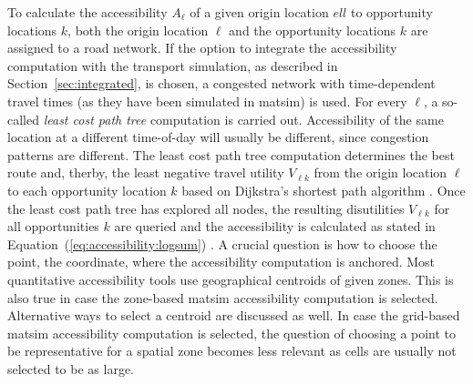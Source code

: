 To calculate the accessibility $A_\ell$ of a given origin location $ell$ to opportunity locations $k$, both
the origin location $\ell$ and the opportunity locations $k$ are assigned to a road network. If the option to
integrate the accessibility computation with the transport simulation, as described in Section~\ref{sec:integrated},
is chosen, a congested network with time-dependent travel times (as they have been simulated in \gls{matsim})
is used. For every $\ell$, a so-called \emph{least cost path tree} computation
\citep{LefebvreBalmer2007Fastshortestpath} is carried out. Accessibility of the same location at a different
time-of-day will usually be different, since congestion patterns are different.
The least cost path tree computation determines the best route and, therby, the least negative travel
utility $V_{\ell k}$ from the origin location $\ell$ to each opportunity location $k$ based on Dijkstra's
shortest path algorithm \citep{Dijkstra1959ShortestPath}. Once the least cost path tree has explored all
nodes, the resulting disutilities $V_{\ell k}$ for all opportunities $k$ are queried and the accessibility
is calculated as stated in Equation~(\ref{eq:accessibility:logsum}) \citep{NicolaiNagelHiResAccessibilityMethod}.
%
A crucial question is how to choose the point, \ie the coordinate, where the accessibility computation is
anchored. Most quantitative accessibility tools use geographical centroids of given zones. This is also
true in case the zone-based \gls{matsim} accessibility computation is selected. Alternative ways to select
a centroid \citep[\eg land-use-based centroids][]{BuettnerEtAl2010Erreichbarkeitsatlas} are discussed as
well. In case the grid-based \gls{matsim} accessibility computation is selected, the question of choosing
a point to be representative for a spatial zone becomes less relevant as cells are usually not selected to
be as large.


